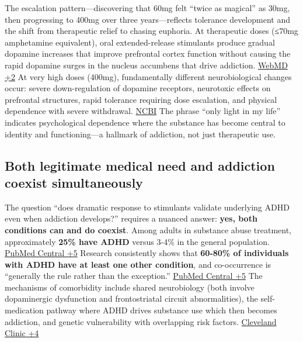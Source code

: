 The escalation pattern---discovering that 60mg felt ``twice as magical'' as 30mg, then progressing to 400mg over three years---reflects tolerance development and the shift from therapeutic relief to chasing euphoria. At therapeutic doses (≤70mg amphetamine equivalent), oral extended-release stimulants produce gradual dopamine increases that improve prefrontal cortex function without causing the rapid dopamine surges in the nucleus accumbens that drive addiction. \href{https://www.webmd.com/add-adhd/adhd-and-substance-abuse-is-there-a-link}{WebMD +2} At very high doses (400mg), fundamentally different neurobiological changes occur: severe down-regulation of dopamine receptors, neurotoxic effects on prefrontal structures, rapid tolerance requiring dose escalation, and physical dependence with severe withdrawal. \href{https://www.ncbi.nlm.nih.gov/books/NBK576548/}{NCBI} The phrase ``only light in my life'' indicates psychological dependence where the substance has become central to identity and functioning---a hallmark of addiction, not just therapeutic use.

\subsection{Both legitimate medical need and addiction coexist simultaneously}\label{10c_self_medication-both-legitimate-medical-need-and-addiction-coexist-simultaneously}

The question ``does dramatic response to stimulants validate underlying ADHD even when addiction develops?'' requires a nuanced answer: \textbf{yes, both conditions can and do coexist}. Among adults in substance abuse treatment, approximately \textbf{25\% have ADHD} versus 3-4\% in the general population. \href{https://pmc.ncbi.nlm.nih.gov/articles/PMC2676785/}{PubMed Central +5} Research consistently shows that \textbf{60-80\% of individuals with ADHD have at least one other condition}, and co-occurrence is ``generally the rule rather than the exception.'' \href{https://pmc.ncbi.nlm.nih.gov/articles/PMC2676785/}{PubMed Central +5} The mechanisms of comorbidity include shared neurobiology (both involve dopaminergic dysfunction and frontostriatal circuit abnormalities), the self-medication pathway where ADHD drives substance use which then becomes addiction, and genetic vulnerability with overlapping risk factors. \href{https://my.clevelandclinic.org/health/symptoms/23224-executive-dysfunction}{Cleveland Clinic +4}


